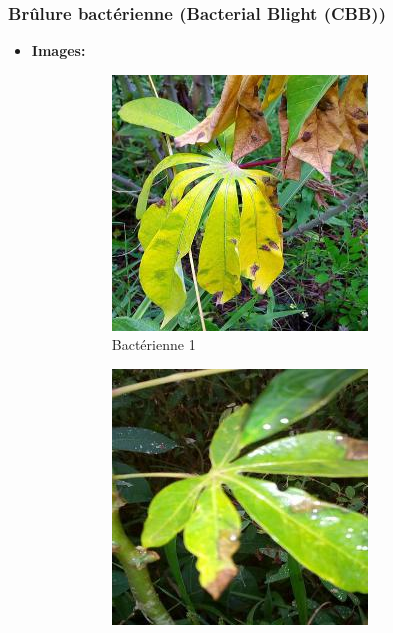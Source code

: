 \documentclass{article}
\begin{document}
	\subsubsection{Brûlure bactérienne (Bacterial Blight (CBB))}
	\begin{itemize}
		\item \textbf{Images: }
		\begin{figure}[htbp]
			\centering
			\begin{subfigure}[b]{0.3\textwidth}
				\centering
				\includegraphics[width=\textwidth]{img/1.jpg}
				\caption{Bactérienne 1}
			\end{subfigure}
			\hfill
			\begin{subfigure}[b]{0.3\textwidth}
				\centering
				\includegraphics[width=\textwidth]{img/2.jpg}

\end{subfigure}
\end{figure}
\end{itemize}
\end{document}

